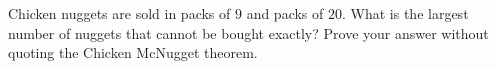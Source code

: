 Chicken nuggets are sold in packs of $9$ and packs of $20$. What is the largest number of nuggets that cannot be bought exactly? Prove your answer without quoting the Chicken McNugget theorem.
